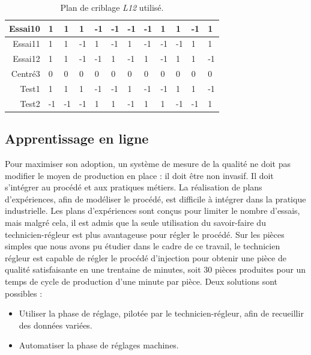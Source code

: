 \begin{table}[hbtp]
\begin{tabular}{m|m|m|m|m|m|m|m|m|m|m|m|}
        \multicolumn{1}{|r|}{Essai10} & 1      & 1       & 1      & -1     & -1    & -1    & -1    & 1      & 1     & -1     & 1     \\ \hline
        \multicolumn{1}{|r|}{Essai11} & 1      & 1       & -1     & 1      & -1    & 1     & -1    & -1     & -1    & 1      & 1     \\ \hline
        \multicolumn{1}{|r|}{Essai12} & 1      & 1       & -1     & -1     & 1     & -1    & 1     & -1     & 1     & 1      & -1    \\ \hline
        \multicolumn{1}{|r|}{Centré3} & 0      & 0       & 0      & 0      & 0     & 0     & 0     & 0      & 0     & 0      & 0     \\ \hline
        \multicolumn{1}{|r|}{Test1}   & 1      & 1       & 1      & -1     & -1    & 1     & -1    & -1     & 1     & 1      & -1    \\ \hline
        \multicolumn{1}{|r|}{Test2}   & -1     & -1      & -1     & 1      & 1     & -1    & 1     & 1      & -1    & -1     & 1     \\ \hline
    \end{tabular}
    \caption{Plan de criblage \textit{L12} utilisé.}
    \label{tab:doe_screening}
\end{table}

\subsection{Apprentissage en ligne}
Pour maximiser son adoption, un système de mesure de la qualité ne doit pas modifier le moyen de production en place : il doit être non invasif.
Il doit s'intégrer au procédé et aux pratiques métiers. La réalisation de plans d'expériences, afin de modéliser le procédé, est difficile à intégrer dans la pratique industrielle.
Les plans d'expériences sont conçus pour limiter le nombre d'essais, mais malgré cela, il est admis que la seule utilisation du savoir-faire du technicien-régleur est plus avantageuse pour régler le procédé.
Sur les pièces simples que nous avons pu étudier dans le cadre de ce travail, le technicien régleur est capable de régler le procédé d'injection pour obtenir une pièce de qualité satisfaisante en une trentaine de minutes, soit 30 pièces produites pour un temps de cycle de production d'une minute par pièce.
Deux solutions sont possibles :
\begin{itemize}
    \item Utiliser la phase de réglage, pilotée par le technicien-régleur, afin de recueillir des données variées.
    \item Automatiser la phase de réglages machines.
\end{itemize}

